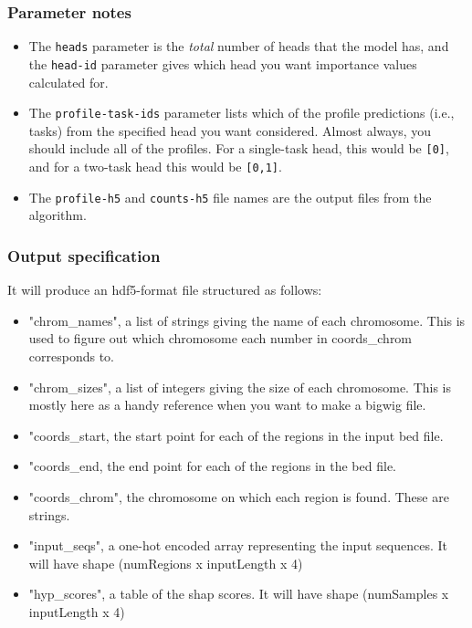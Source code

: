 \documentclass{article}
\begin{document}
\subsubsection{Parameter notes}
\begin{itemize}
    \item The \texttt{heads} parameter is the \emph{total} number of heads that the model has, and the \texttt{head-id} parameter gives which head you want importance values calculated for. 
    \item The \texttt{profile-task-ids} parameter lists which of the profile predictions (i.e., tasks) from the specified head you want considered. Almost always, you should include all of the profiles. For a single-task head, this would be \texttt{[0]}, and for a two-task head this would be \texttt{[0,1]}.
    \item The \texttt{profile-h5} and \texttt{counts-h5} file names are the output files from the algorithm. 
\end{itemize}

\subsubsection{Output specification}

It will produce an hdf5-format file structured as follows:

\begin{itemize}
    \item "chrom\_names", a list of strings giving the name of each chromosome. This is used to figure out which chromosome each number in coords\_chrom corresponds to. 
    \item "chrom\_sizes", a list of integers giving the size of each chromosome. This is mostly here as a handy reference when you want to make a bigwig file. 
    \item "coords\_start, the start point for each of the regions in the input bed file. 
    \item "coords\_end, the end point for each of the regions in the bed file. 
    \item "coords\_chrom", the chromosome on which each region is found. These are strings.
    \item "input\_seqs", a one-hot encoded array representing the input sequences. It will have shape (numRegions x inputLength x 4)
    \item "hyp\_scores", a table of the shap scores. It will have shape (numSamples x inputLength x 4) 

\end{itemize}
\end{document}
